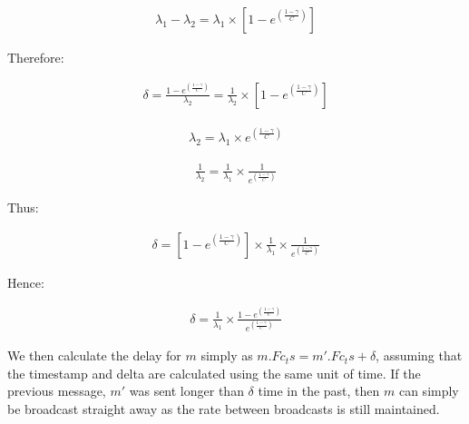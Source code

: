     \begin{equation}
		     \begin{aligned}
		         \lambda_1 - \lambda_2 = \lambda_1 \times [1 - e ^{ ({\frac{1-\gamma}{C}})}]
		     \end{aligned}
    \end{equation} 
    
    Therefore:
    
    \begin{equation}
		     \begin{aligned}
		         \delta = \frac{1 - e ^{ ({\frac{1-\gamma}{C}})}}{\lambda_2} = \frac{1}{\lambda_2} \times [1 - e ^{ ({\frac{1-\gamma}{C}})}]
		     \end{aligned}
    \end{equation}
    
    \begin{equation}
		     \begin{aligned}
		         \lambda_2 = \lambda_1 \times e ^{ ({\frac{1-\gamma}{C}})}
		     \end{aligned}
    \end{equation}     
    
    \begin{equation}
		     \begin{aligned}
		         \frac{1}{\lambda_2} = \frac{1}{\lambda_1} \times \frac{1}{e ^{ ({\frac{1-\gamma}{C}})}}
		     \end{aligned}
    \end{equation}
    
    Thus:
    
     \begin{equation}
		     \begin{aligned}
		         \delta = [1 - e ^{ ({\frac{1-\gamma}{C}})}] \times \frac{1}{\lambda_1} \times \frac{1}{e ^{ ({\frac{1-\gamma}{C}})}}
		     \end{aligned}
    \end{equation}
    
    Hence:
    
        \begin{equation}
		     \begin{aligned}
		         \delta = \frac{1}{\lambda_1}  \times   \frac{1 - e ^{ ({\frac{1-\gamma}{C}})}}{e ^{ ({\frac{1-\gamma}{C}})}}
		     \end{aligned}
    \end{equation}
    
    We then calculate the delay for $m$ simply as $m.Fc_ts = m'.Fc_ts + \delta$, assuming that the timestamp and delta are calculated using the same unit of time.  If the previous message, $m'$ was sent longer than $\delta$ time in the past, then $m$ can simply be broadcast straight away as the rate between broadcasts is still maintained.  
    
